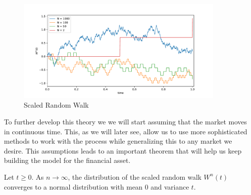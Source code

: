 \documentclass[../TGMAFFIRO]{subfiles}
\begin{document}
\begin{figure}[h]
	\label{fig:scaled_random_walk}
	\centering
	\includegraphics[width=0.9\textwidth]{images/scaled_random_walk}
	\caption{Scaled Random Walk}
\end{figure}



To further develop this theory we we will start assuming that the market moves in continuous time. This, as we will later see, allow us to use more sophisticated methods to work with the process while generalizing this to any market we desire. This assumptions leads to an important theorem that will help us keep building the model for the financial asset.

\begin{theorem}\label{th:convergence_rw}
	Let $t \geq 0$. As $n \to \infty$, the distribution of the scaled random walk $W^n(t)$ converges to a normal distribution with mean $0$ and variance $t$.
\end{theorem}
\end{document}
